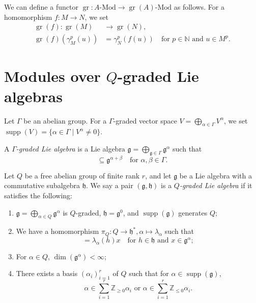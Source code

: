 \documentclass[a4paper, 12pt, reqno]{amsart}
\theoremstyle{remark}
\DeclareMathOperator{\gr}{gr}
\DeclareMathOperator{\supp}{supp}
\begin{document}
We can define a functor $\gr: A\text{-Mod} \to \gr(A)\text{-Mod}$ as follows.
For a homomorphism $f: M \to N$, we set
\begin{align*}
  \gr(f): \gr(M) &\to \gr(N), \\
  \gr(f)(\gamma_M^p(u)) &= \gamma_N^p(f(u)) \quad \text{for $p \in \mathbb{N}$ and $u \in M^p$}.
\end{align*}

\section{Modules over $Q$-graded Lie algebras}
\label{sec:modules-over-q}

Let $\Gamma$ be an abelian group.
For a $\Gamma$-graded vector space $V = \bigoplus_{\alpha \in \Gamma}V^{\alpha}$, we set $\supp(V) = \{\alpha \in \Gamma \mid V^{\alpha} \neq 0\}$.

A \emph{$\Gamma$-graded Lie algebra} is a Lie algebra $\mathfrak{g} = \bigoplus_{\mathfrak{g} \in \Gamma}\mathfrak{g}^{\alpha}$ such that
\begin{equation*}
  [\mathfrak{g}^{\alpha}, \mathfrak{g}^{\beta}] \subseteq \mathfrak{g}^{\alpha + \beta} \quad \text{for $\alpha, \beta \in \Gamma$}.
\end{equation*}

Let $Q$ be a free abelian group of finite rank $r$, and let $\mathfrak{g}$ be a Lie algebra with a commutative subalgebra $\mathfrak{h}$.
We say a pair $(\mathfrak{g}, \mathfrak{h})$ is a \emph{$Q$-graded Lie algebra} if it satisfies the following:
\begin{enumerate}
\item $\mathfrak{g} = \bigoplus_{\alpha \in Q}\mathfrak{g}^{\alpha}$ is $Q$-graded, $\mathfrak{h} = \mathfrak{g}^0$, and $\supp(\mathfrak{g})$ generates $Q$;
\item We have a homomorphism $\pi_Q: Q \to \mathfrak{h}^*, \alpha \mapsto \lambda_{\alpha}$ such  that
  \begin{equation*}
    [h, x] = \lambda_{\alpha}(h)x \quad \text{for $h \in \mathfrak{h}$ and $x \in \mathfrak{g}^{\alpha}$};
  \end{equation*}
\item For $\alpha \in Q$, $\dim(\mathfrak{g}^{\alpha}) < \infty$;
\item There exists a basis $(\alpha_i)_{i = 1}^r$ of $Q$ such that for $\alpha \in \supp(\mathfrak{g})$,
  \begin{equation*}
    \text{$\alpha \in \sum_{i = 1}^r\mathbb{Z}_{\ge 0}\alpha_i$ or $\alpha \in \sum_{i = 1}^r\mathbb{Z}_{\le 0}\alpha_i$}.
  \end{equation*}
\end{enumerate}
\end{document}

